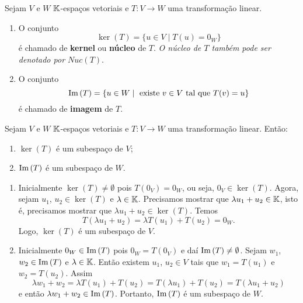 \begin{definicao}
    Sejam $V$ e $W$ $\mathbb{K}$-espaços vetoriais e $T \colon V \to W$ uma transformação linear.
    \begin{enumerate}[label={\roman*})]
        \item O conjunto
        \[
            \ker(T) = \{u \in V \mid T(u) = 0_W\}
        \]
        é chamado de \textbf{kernel} ou \textbf{núcleo} de $T$. \textit{O núcleo de $T$ também pode ser denotado por $Nuc(T)$}.

        \item O conjunto
        \[
            {\rm Im\,}(T) = \{u \in W \mid \mbox{ existe } v \in V \mbox{ tal que } T(v) = u\}
        \]
        é chamado de \textbf{imagem} de $T$.
    \end{enumerate}
\end{definicao}

\begin{proposicao}
    Sejam $V$ e $W$ $\mathbb{K}$-espaços vetoriais e $T \colon V \to W$ uma transformação linear. Então:
        \begin{enumerate}[label={\roman*})]
            \item $\ker(T)$ é um subespaço de $V$;
            \item ${\rm Im\,}(T)$ é um subespaço de $W$.
        \end{enumerate}
\end{proposicao}
\begin{prova}
    \begin{enumerate}[label={\roman*})]
        \item Inicialmente $\ker(T) \ne \emptyset$ pois $T(0_V) = 0_W$, ou seja, $0_V \in \ker(T)$. Agora, sejam $u_1$, $u_2 \in \ker(T)$ e $\lambda \in \mathbb{K}$. Precisamos mostrar que $\lambda u_1 + u_2 \in \mathbb{K}$, isto é, precisamos mostrar que $\lambda u_1 + u_2 \in \ker(T)$. Temos
        \[
            T(\lambda u_1 + u_2) = \lambda T(u_1) + T(u_2) = 0_W.
        \]
        Logo, $\ker(T)$ é um subespaço de $V$.

        \item Inicialmente $0_W \in {\rm Im\,}(T)$ pois $0_W = T(0_V)$ e daí ${\rm Im\,}(T) \ne \emptyset$. Sejam $w_1$, $w_2 \in {\rm Im\,}(T)$ e $\lambda \in \mathbb{K}$. Então existem $u_1$, $u_2 \in V$ tais que $w_1 = T(u_1)$ e $w_2 = T(u_2)$. Assim
        \[
            \lambda w_1 + w_2 = \lambda T(u_1) + T(u_2) = T(\lambda u_1) + T(u_2) = T(\lambda u_1 + u_2)
        \]
        e então $\lambda w_1 + w_2 \in {\rm Im\,}(T)$. Portanto, ${\rm Im\,}(T)$ é um subespaço de $W$.
    \end{enumerate}
\end{prova}


